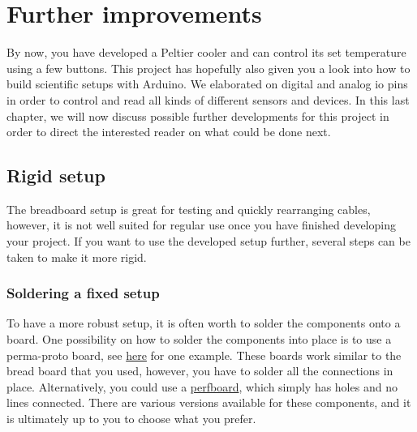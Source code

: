 
\chapter{Further improvements}\label{chap:outlook}
By now, you have developed a Peltier cooler and can control its set temperature using a few buttons. This project has hopefully also given you a look into how to build scientific setups with Arduino. We elaborated on digital and analog \ac{io} pins in order to control and read all kinds of different sensors and devices. In this last chapter, we will now discuss possible further developments for this project in order to direct the interested reader on what could be done next.


\section{Rigid setup}

The breadboard setup is great for testing and quickly rearranging cables, however, it is not well suited for regular use once you have finished developing your project. If you want to use the developed setup further, several steps can be taken to make it more rigid.

\subsection{Soldering a fixed setup}

To have a more robust setup, it is often worth to solder the components onto a board. One possibility on how to solder the components into place is to use a perma-proto board, see \href{https://www.adafruit.com/product/571}{here} for one example. These boards work similar to the bread board that you used, however, you have to solder all the connections in place. Alternatively, you could use a \href{https://en.wikipedia.org/wiki/Perfboard}{perfboard}, which simply has holes and no lines connected. There are various versions available for these components, and it is ultimately up to you to choose what you prefer.


